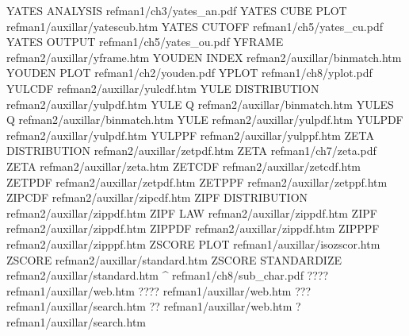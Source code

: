 YATES ANALYSIS                          refman1/ch3/yates_an.pdf
YATES CUBE PLOT                         refman1/auxillar/yatescub.htm
YATES CUTOFF                            refman1/ch5/yates_cu.pdf
YATES OUTPUT                            refman1/ch5/yates_ou.pdf
YFRAME                                  refman2/auxillar/yframe.htm
YOUDEN INDEX                            refman2/auxillar/binmatch.htm
YOUDEN PLOT                             refman1/ch2/youden.pdf
YPLOT                                   refman1/ch8/yplot.pdf
YULCDF                                  refman2/auxillar/yulcdf.htm
YULE DISTRIBUTION                       refman2/auxillar/yulpdf.htm
YULE Q                                  refman2/auxillar/binmatch.htm
YULES Q                                 refman2/auxillar/binmatch.htm
YULE                                    refman2/auxillar/yulpdf.htm
YULPDF                                  refman2/auxillar/yulpdf.htm
YULPPF                                  refman2/auxillar/yulppf.htm
ZETA DISTRIBUTION                       refman2/auxillar/zetpdf.htm
ZETA                                    refman1/ch7/zeta.pdf
ZETA                                    refman2/auxillar/zeta.htm
ZETCDF                                  refman2/auxillar/zetcdf.htm
ZETPDF                                  refman2/auxillar/zetpdf.htm
ZETPPF                                  refman2/auxillar/zetppf.htm
ZIPCDF                                  refman2/auxillar/zipcdf.htm
ZIPF DISTRIBUTION                       refman2/auxillar/zippdf.htm
ZIPF LAW                                refman2/auxillar/zippdf.htm
ZIPF                                    refman2/auxillar/zippdf.htm
ZIPPDF                                  refman2/auxillar/zippdf.htm
ZIPPPF                                  refman2/auxillar/zipppf.htm
ZSCORE PLOT                             refman1/auxillar/isozscor.htm
ZSCORE                                  refman2/auxillar/standard.htm
ZSCORE STANDARDIZE                      refman2/auxillar/standard.htm
^                                       refman1/ch8/sub_char.pdf
????                                    refman1/auxillar/web.htm
????                                    refman1/auxillar/web.htm
???                                     refman1/auxillar/search.htm
??                                      refman1/auxillar/web.htm
?                                       refman1/auxillar/search.htm
